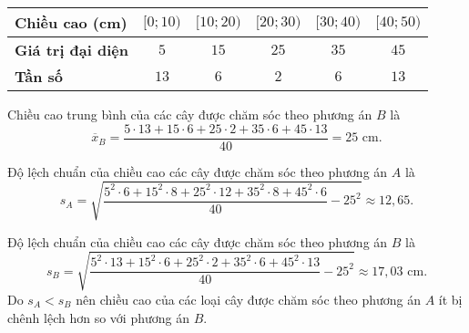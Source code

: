 \begin{ex}
{\begin{enumEX}{1}
\begin{center}
\begin{tabular}{|l|c|c|c|c|c|}
					\textbf{Chiều cao (cm)}   & $[0; 10)$ & $ [10; 20)$ & $ [20; 30)$ & $ [30; 40)$ & $ [40; 50)$ \\
					\hline
					\textbf{Giá trị đại diện} & $5$       & $15$        & $25$        & $35$        & $45$        \\ \hline
					\textbf{Tần số }          & $ 13 $    & $6$         & $2$         & $6$         & $13$        \\
					\hline \hline
				\end{tabular}
			\end{center}
			Chiều cao trung bình của các cây được chăm sóc theo phương án $B$ là $$\overline{x}_B= \dfrac{5 \cdot 13 + 15 \cdot 6 + 25 \cdot 2 + 35 \cdot 6 + 45 \cdot 13}{40}=25 \text{ cm}.$$
			\item 	Độ lệch chuẩn của chiều cao các cây được chăm sóc theo phương án $A$ là $$s_A =\sqrt{\dfrac{5^2 \cdot 6 + 15^2 \cdot 8 + 25^2 \cdot 12 + 35^2 \cdot 8 + 45 ^2 \cdot 6}{40} - 25^2}\approx 12{,} 65. $$
			\item Độ lệch chuẩn của chiều cao các cây được chăm sóc theo phương án $B$ là $$s_B =\sqrt{\dfrac{5^2 \cdot 13 + 15^2 \cdot 6 + 25^2 \cdot 2 + 35^2 \cdot 6+ 45 ^2 \cdot 13}{40} - 25^2}\approx 17{,} 03 \text{ cm}. $$
			Do $s_A< s_B$ nên chiều cao của các loại cây được chăm sóc theo phương án $A$ ít bị chênh lệch hơn so với phương án $B$.
		\end{enumEX}}
\end{ex}

